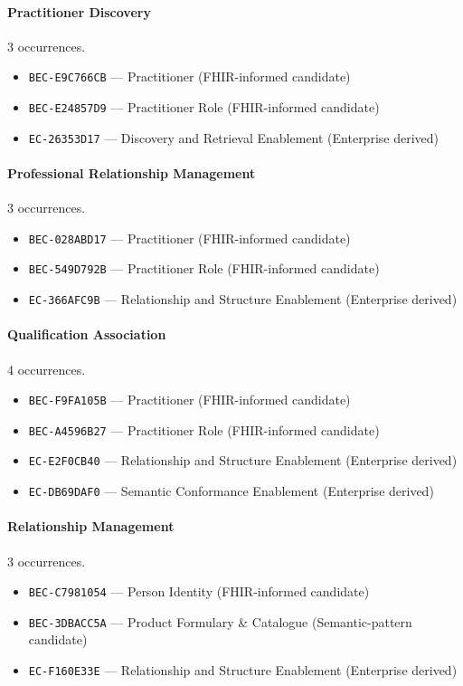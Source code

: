 \documentclass[11pt,a4paper,openany]{book}
\begin{document}
\paragraph{Practitioner Discovery} 3 occurrences.\par
\begin{itemize}
\item \texttt{BEC-E9C766CB} --- Practitioner (FHIR-informed candidate)
\item \texttt{BEC-E24857D9} --- Practitioner Role (FHIR-informed candidate)
\item \texttt{EC-26353D17} --- Discovery and Retrieval Enablement (Enterprise derived)
\end{itemize}
\paragraph{Professional Relationship Management} 3 occurrences.\par
\begin{itemize}
\item \texttt{BEC-028ABD17} --- Practitioner (FHIR-informed candidate)
\item \texttt{BEC-549D792B} --- Practitioner Role (FHIR-informed candidate)
\item \texttt{EC-366AFC9B} --- Relationship and Structure Enablement (Enterprise derived)
\end{itemize}
\paragraph{Qualification Association} 4 occurrences.\par
\begin{itemize}
\item \texttt{BEC-F9FA105B} --- Practitioner (FHIR-informed candidate)
\item \texttt{BEC-A4596B27} --- Practitioner Role (FHIR-informed candidate)
\item \texttt{EC-E2F0CB40} --- Relationship and Structure Enablement (Enterprise derived)
\item \texttt{EC-DB69DAF0} --- Semantic Conformance Enablement (Enterprise derived)
\end{itemize}
\paragraph{Relationship Management} 3 occurrences.\par
\begin{itemize}
\item \texttt{BEC-C7981054} --- Person Identity (FHIR-informed candidate)
\item \texttt{BEC-3DBACC5A} --- Product Formulary \& Catalogue (Semantic-pattern candidate)
\item \texttt{EC-F160E33E} --- Relationship and Structure Enablement (Enterprise derived)
\end{itemize}
\end{document}
